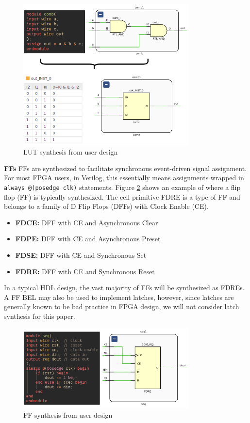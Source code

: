 \documentclass[twocolumn]{article}
\begin{document}
        \begin{figure}[]
            \centering
            \includegraphics[width=9.0cm]{figures/lut_synthesis.png}
            \caption{LUT synthesis from user design}
            \label{fig:lut_synthesis}
        \end{figure}

    \textbf{FFs} \quad
        FFs are synthesized to facilitate synchronous event-driven signal assignment. 
        For most FPGA users, in Verilog, this essentially means assignments wrapped in \texttt{always @(posedge clk)} statements. 
        Figure \ref{fig:ff_synthesis} shows an example of where a flip flop (FF) is typically synthesized. 
        The cell primitive FDRE is a type of FF and belongs to a family of D Flip Flops (DFFs) with Clock Enable (CE). 
        \begin{itemize}
            \item \textbf{FDCE:} DFF with CE and Asynchronous Clear
            \item \textbf{FDPE:} DFF with CE and Asynchronous Preset
            \item \textbf{FDSE:} DFF with CE and Synchronous Set
            \item \textbf{FDRE:} DFF with CE and Synchronous Reset
        \end{itemize}
        In a typical HDL design, the vast majority of FFs will be synthesized as FDREs. 
        A FF BEL may also be used to implement latches, however, since latches are generally known to be bad practice in FPGA design, we will not consider latch synthesis for this paper. 
        \begin{figure}[]
            \centering
            \includegraphics[width=9.0cm]{figures/ff_synthesis.png}
            \caption{FF synthesis from user design}
            \label{fig:ff_synthesis}
        \end{figure}
\end{document}
